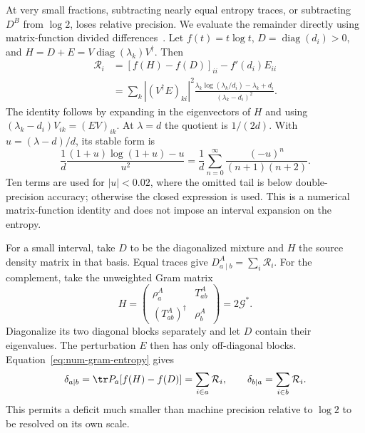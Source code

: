 At very small fractions, subtracting nearly equal entropy traces,
or subtracting $D^B$ from $\log2$, loses relative precision.
We evaluate the remainder directly using matrix-function
divided differences~\cite{numHigham}. Let $f(t)=t\log t$,
$D=\operatorname{diag}(d_i)>0$, and
$H=D+E=V\operatorname{diag}(\lambda_k)V^\dagger$. Then
\begin{align}
 \mathcal R_i&=[f(H)-f(D)]_{ii}-f'(d_i)E_{ii}\nonumber\\
 &=\sum_k|(V^\dagger E)_{ki}|^2
 \frac{\lambda_k\log(\lambda_k/d_i)-\lambda_k+d_i}
      {(\lambda_k-d_i)^2}.
 \label{eq:num-stable-remainder}
\end{align}
The identity follows by expanding in the eigenvectors of $H$
and using $(\lambda_k-d_i)V_{ik}=(EV)_{ik}$.
At $\lambda=d$ the quotient is $1/(2d)$. With
$u=(\lambda-d)/d$, its stable form is
\begin{equation}
 \frac1d\frac{(1+u)\log(1+u)-u}{u^2}
 =\frac1d\sum_{n=0}^{\infty}\frac{(-u)^n}{(n+1)(n+2)}.
 \label{eq:num-scalar-remainder}
\end{equation}
Ten terms are used for $|u|<0.02$, where the omitted tail is
below double-precision accuracy; otherwise the closed expression
is used. This is a numerical matrix-function identity and
does not impose an interval expansion on the entropy.

For a small interval, take $D$ to be the diagonalized mixture
and $H$ the source density matrix in that basis. Equal traces
give $D^A_{a\mid b}=\sum_i\mathcal R_i$. For the complement,
take the unweighted Gram matrix
\begin{equation}
 H=\begin{pmatrix}\rho_a^A&T_{ab}^A\\
 (T_{ab}^A)^\dagger&\rho_b^A\end{pmatrix}=2\mathcal G^*.
 \label{eq:num-unweighted-gram}
\end{equation}
Diagonalize its two diagonal blocks separately and let $D$
contain their eigenvalues. The perturbation $E$ then has only
off-diagonal blocks. Equation~\eqref{eq:num-gram-entropy} gives
\begin{equation}
 \delta_{a\mid b}=\tr P_a[f(H)-f(D)]
                 =\sum_{i\in a}\mathcal R_i,
 \qquad \delta_{b\mid a}=\sum_{i\in b}\mathcal R_i.
 \label{eq:num-stable-deficit}
\end{equation}
This permits a deficit much smaller than machine precision
relative to $\log2$ to be resolved on its own scale.

